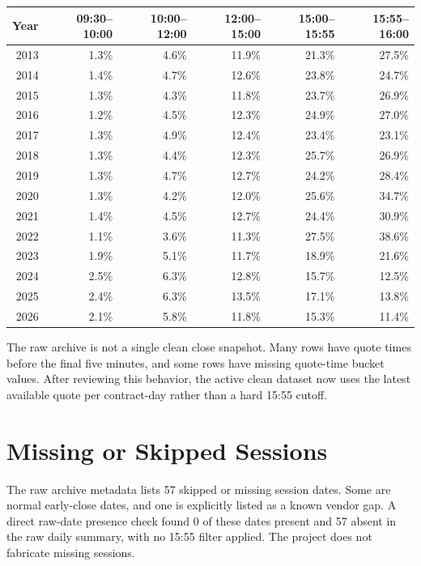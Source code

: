 \documentclass[11pt]{article}
\begin{document}
\begingroup
\scriptsize
\begin{longtable}{rrrrrr}
\toprule
Year & 09:30--10:00 & 10:00--12:00 & 12:00--15:00 & 15:00--15:55 & 15:55--16:00 \\
\midrule
2013 & 1.3\% & 4.6\% & 11.9\% & 21.3\% & 27.5\% \\
2014 & 1.4\% & 4.7\% & 12.6\% & 23.8\% & 24.7\% \\
2015 & 1.3\% & 4.3\% & 11.8\% & 23.7\% & 26.9\% \\
2016 & 1.2\% & 4.5\% & 12.3\% & 24.9\% & 27.0\% \\
2017 & 1.3\% & 4.9\% & 12.4\% & 23.4\% & 23.1\% \\
2018 & 1.3\% & 4.4\% & 12.3\% & 25.7\% & 26.9\% \\
2019 & 1.3\% & 4.7\% & 12.7\% & 24.2\% & 28.4\% \\
2020 & 1.3\% & 4.2\% & 12.0\% & 25.6\% & 34.7\% \\
2021 & 1.4\% & 4.5\% & 12.7\% & 24.4\% & 30.9\% \\
2022 & 1.1\% & 3.6\% & 11.3\% & 27.5\% & 38.6\% \\
2023 & 1.9\% & 5.1\% & 11.7\% & 18.9\% & 21.6\% \\
2024 & 2.5\% & 6.3\% & 12.8\% & 15.7\% & 12.5\% \\
2025 & 2.4\% & 6.3\% & 13.5\% & 17.1\% & 13.8\% \\
2026 & 2.1\% & 5.8\% & 11.8\% & 15.3\% & 11.4\% \\
\bottomrule
\end{longtable}
\endgroup

The raw archive is not a single clean close snapshot. Many rows have quote
times before the final five minutes, and some rows have missing quote-time
bucket values. After reviewing this behavior, the active clean dataset now uses
the latest available quote per contract-day rather than a hard 15:55 cutoff.

\section*{Missing or Skipped Sessions}

The raw archive metadata lists 57 skipped or missing
session dates. Some are normal early-close dates, and one is explicitly listed
as a known vendor gap. A direct raw-date presence check found 0
of these dates present and 57 absent in the raw daily summary,
with no 15:55 filter applied. The project does not fabricate missing sessions.
\end{document}
